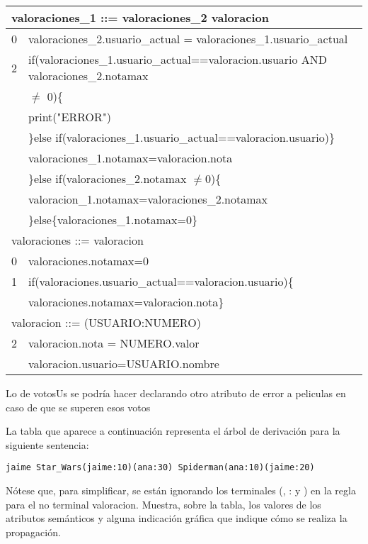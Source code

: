 \begin{problem}[2]
\begin{tabular}{|c|l|}
\hline
\multicolumn{2}{|l|}{valoraciones\_1 ::= valoraciones\_2 valoracion} \\
\hline
0 & valoraciones\_2.usuario\_actual = valoraciones\_1.usuario\_actual\\
\hline
2 & if(valoraciones\_1.usuario\_actual==valoracion.usuario AND valoraciones\_2.notamax\\& $\neq$ 0)\{\\ &
print("ERROR")\\&
\}else if(valoraciones\_1.usuario\_actual==valoracion.usuario)\}\\&
valoraciones\_1.notamax=valoracion.nota\\&
\}else if(valoraciones\_2.notamax $\neq$0)\{\\&
valoracion\_1.notamax=valoraciones\_2.notamax\\&
\}else\{valoraciones\_1.notamax=0\}\\
\hline
\multicolumn{2}{|l|}{valoraciones ::= valoracion} \\
\hline
 0 & valoraciones.notamax=0 \\
 \hline
 1 & if(valoraciones.usuario\_actual==valoracion.usuario)\{\\ &
 valoraciones.notamax=valoracion.nota\}\\
\hline
\multicolumn{2}{|l|}{valoracion ::= (USUARIO:NUMERO)} \\
\hline
 2 & valoracion.nota = NUMERO.valor\\ & valoracion.usuario=USUARIO.nombre\\
 \hline

\end{tabular}


Lo de votosUs se podría hacer declarando otro atributo de error a peliculas en caso de que se superen esos votos
\end{problem}

\begin{problem}[3]
La tabla que aparece a continuación representa el árbol de derivación para la siguiente sentencia:
\begin{verbatim}
jaime Star_Wars(jaime:10)(ana:30) Spiderman(ana:10)(jaime:20)
\end{verbatim}
Nótese que, para simplificar, se están ignorando los terminales (, : y ) en la regla para el no terminal valoracion. Muestra, sobre la tabla, los valores de los atributos semánticos y alguna indicación gráfica que indique cómo se realiza la propagación.
\solution
\newpage


\newpage

\end{problem}

